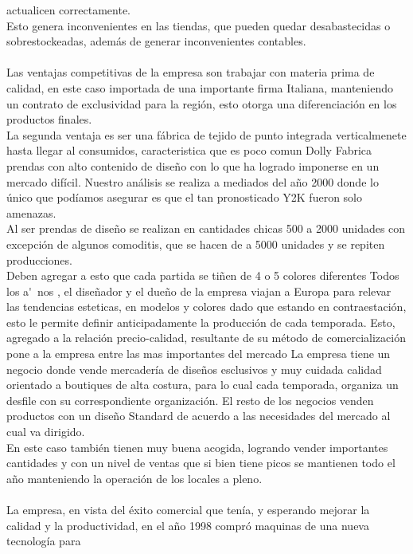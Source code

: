 \documentclass[a4paper,12pt,titlepage]{article}
\begin{document}
actualicen correctamente.\\
Esto genera inconvenientes en las tiendas, que pueden quedar desabastecidas o
sobrestockeadas, adem\'{a}s de generar inconvenientes contables.\\ \\
Las ventajas competitivas de la empresa son trabajar con materia prima de calidad,
en este caso importada de una importante firma Italiana, manteniendo un contrato
de exclusividad para la regi\'{o}n, esto otorga una diferenciaci\'{o}n en los productos
finales.\\
La segunda ventaja es ser una f\'{a}brica de tejido de punto integrada verticalmenete
hasta llegar al consumidos, caracteristica que es poco comun
Dolly Fabrica prendas con alto contenido de dise\~no con lo que ha logrado
imponerse en un mercado dif\'{i}cil. Nuestro an\'{a}lisis se realiza a mediados del a\~no
2000 donde lo \'{u}nico que pod\'{i}amos asegurar es que el tan pronosticado Y2K
fueron solo amenazas.\\
Al ser prendas de dise\~no se realizan en cantidades chicas 500 a 2000 unidades
con excepci\'{o}n de algunos comoditis, que se hacen de a 5000 unidades y se
repiten producciones.\\
Deben agregar a esto que cada partida se ti\~nen de 4 o 5 colores diferentes
Todos los a\'~nos , el dise\~nador y el due\~no de la empresa viajan a Europa para
relevar las tendencias esteticas, en modelos y colores dado que estando en
contraestaci\'{o}n, esto le permite definir anticipadamente la producci\'{o}n de cada
temporada. Esto, agregado a la relaci\'{o}n precio-calidad, resultante de su m\'{e}todo
de comercializaci\'{o}n pone a la empresa entre las mas importantes del mercado
La empresa tiene un negocio donde vende mercader\'{i}a de dise\~nos esclusivos y
muy cuidada calidad orientado a boutiques de alta costura, para lo cual cada
temporada, organiza un desfile con su correspondiente organizaci\'{o}n. El resto de
los negocios venden productos con un dise\~no Standard de acuerdo a las
necesidades del mercado al cual va dirigido.\\
En este caso tambi\'{e}n tienen muy buena acogida, logrando vender importantes
cantidades y con un nivel de ventas que si bien tiene picos se mantienen todo el
a\~no manteniendo la operaci\'{o}n de los locales a pleno.\\ \\
La empresa, en vista del \'{e}xito comercial que ten\'{i}a, y esperando mejorar la calidad
y la productividad, en el a\~no 1998 compr\'{o} maquinas de una nueva tecnolog\'{i}a para
\end{document}
